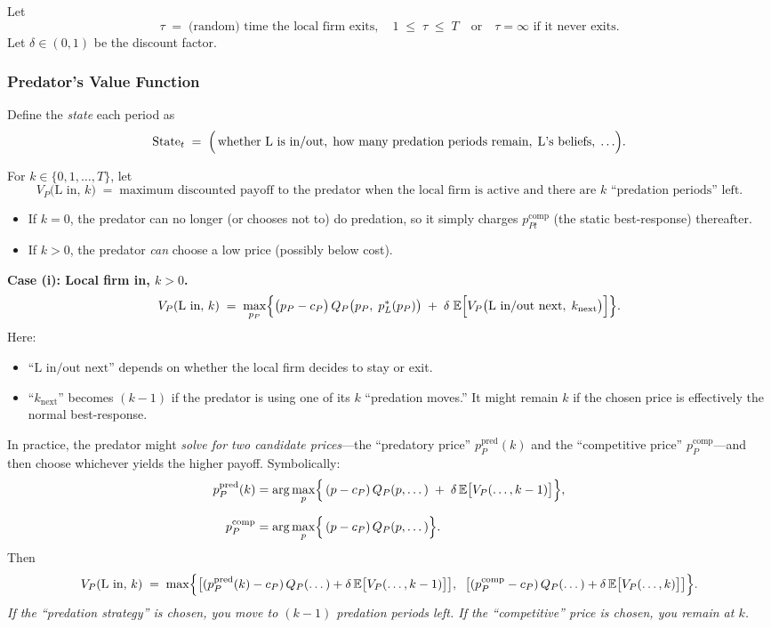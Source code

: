 \documentclass[12pt,oneside]{article}
\theoremstyle{definition}
\theoremstyle{remark}
\begin{document}
\noindent
Let
\[
\tau \;=\;
\text{(random) time the local firm exits},\quad
1 \;\le\; \tau \;\le\; T\quad
\text{or}\quad \tau=\infty \text{ if it never exits}.
\]
Let $\delta \in (0,1)$ be the discount factor.

\subsubsection{Predator's Value Function}

Define the \emph{state} each period as
\[
\text{State}_t \;=\;
\Bigl(\,\text{whether L is in/out},\;
\text{how many predation periods remain},\;
\text{L's beliefs},\;\ldots \Bigr).
\]

\noindent
For $k \in \{0,1,\dots,T\}$, let
\[
V_P\bigl(\text{L in},\, k\bigr)
\;=\;
\text{maximum discounted payoff to the predator when the local firm is active and there are $k$ ``predation periods'' left.}
\]
\begin{itemize}
\item If $k=0$, the predator can no longer (or chooses not to) do predation, so it simply charges $p_{Pt}^{\text{comp}}$ (the static best-response) thereafter.
\item If $k>0$, the predator \emph{can} choose a low price (possibly below cost).
\end{itemize}

\noindent
\textbf{Case (i): Local firm in, $k>0$.}
\[
V_P(\text{L in},\, k)
\;=\;
\max_{p_P}
\Bigl\{
\bigl(p_P - c_P\bigr)\,Q_P\bigl(p_P,\;p_{L}^*(p_P)\bigr)
\;+\;
\delta \;\mathbb{E}\Bigl[
V_P\bigl(\text{L in/out next},\;k_{\text{next}}\bigr)
\Bigr]
\Bigr\}.
\]
Here:
\begin{itemize}
\item ``$\text{L in/out next}$'' depends on whether the local firm decides to stay or exit.
\item ``$k_{\text{next}}$'' becomes $(k-1)$ if the predator is using one of its $k$ ``predation moves.'' It might remain $k$ if the chosen price is effectively the normal best-response.
\end{itemize}

\noindent
In practice, the predator might \emph{solve for two candidate prices}---the ``predatory price'' $p_{P}^{\text{pred}}(k)$ and the ``competitive price'' $p_{P}^{\text{comp}}$---and then choose whichever yields the higher payoff. Symbolically:
\[
\begin{aligned}
p_{P}^{\text{pred}}(k)
&=\arg\max_{p}
\Bigl\{\,
(p - c_P)\,Q_P(p,\dots)
\;+\;
\delta\,\mathbb{E}\bigl[V_P(\dots,k-1)\bigr]
\Bigr\},\\[6pt]
p_{P}^{\text{comp}}
&=\arg\max_{p}
\Bigl\{\,
(p - c_P)\,Q_P(p,\dots)
\Bigr\}.
\end{aligned}
\]
Then
\[
V_P(\text{L in},\, k)
\;=\;
\max
\Bigl\{
\bigl[(p_{P}^{\text{pred}}(k) - c_P)\,Q_P(\dots)
+ \delta\,\mathbb{E}\bigl[V_P(\dots,k-1)\bigr]\bigr],
\;\;
\bigl[(p_{P}^{\text{comp}} - c_P)\,Q_P(\dots)
+ \delta\,\mathbb{E}\bigl[V_P(\dots,k)\bigr]\bigr]
\Bigr\}.
\]
\emph{If the ``predation strategy'' is chosen, you move to $(k-1)$ predation periods left. If the ``competitive'' price is chosen, you remain at $k$.}
\end{document}
